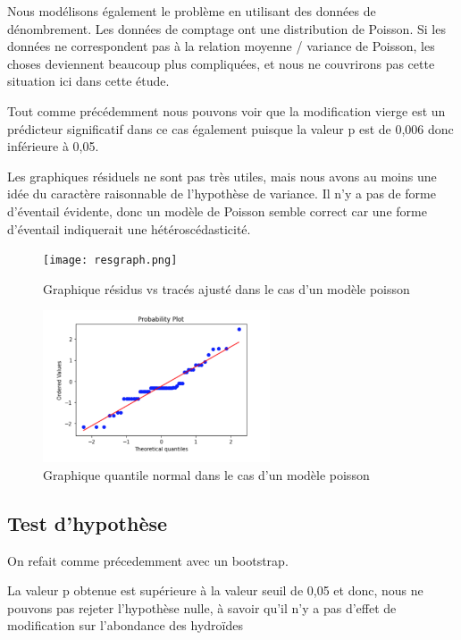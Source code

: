 \documentclass{article}
\theoremstyle{definition}
\begin{document}
Nous modélisons également le problème en utilisant des données de dénombrement. Les données de comptage ont une distribution de Poisson. Si les données ne correspondent pas à la relation moyenne / variance de Poisson, les choses deviennent beaucoup plus compliquées, et nous ne couvrirons pas cette situation ici dans cette étude.


Tout comme précédemment nous pouvons voir que la modification vierge est un prédicteur significatif dans ce cas également puisque la valeur p est de 0,006 donc inférieure à 0,05.


Les graphiques résiduels ne sont pas très utiles, mais nous avons au moins une idée du caractère raisonnable de l’hypothèse de variance. Il n'y a pas de forme d'éventail évidente, donc un modèle de Poisson semble correct car une forme d'éventail indiquerait une hétéroscédasticité.



\begin{figure}[!h]
\centerline{\texttt{[image: resgraph.png]}}
\caption{Graphique résidus vs tracés ajusté dans le cas d'un modèle poisson}
\label{exemple somme}
\end{figure}




\begin{figure}[!h]
\centerline{\includegraphics[width=0.6\textwidth]{eventail.png}}
\caption{Graphique quantile normal dans le cas d'un modèle poisson}
\label{exemple somme}
\end{figure}

\vspace{4cm}

\subsection{Test d'hypothèse}

On refait comme précedemment avec un bootstrap.


La valeur p obtenue est supérieure à la valeur seuil de 0,05 et donc, nous ne pouvons pas rejeter l'hypothèse nulle, à savoir qu'il n'y a pas d'effet de modification sur l'abondance des hydroïdes
\end{document}

